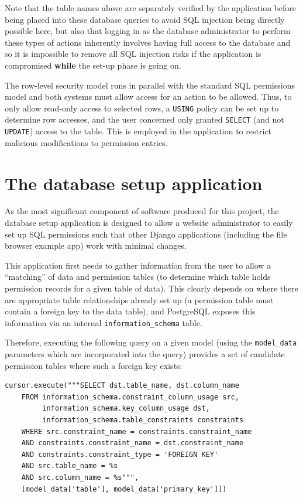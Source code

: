 \documentclass[12pt]{report}
\begin{document}
Note that the table names above are separately verified by the application before being placed into these database queries to avoid SQL injection being directly possible here, but also that logging in as the database administrator to perform these types of actions inherently involves having full access to the database and so it is impossible to remove all SQL injection risks if the application is compromised \textbf{while} the set-up phase is going on.

The row-level security model runs in parallel with the standard SQL permissions model and both systems must allow access for an action to be allowed. Thus, to only allow read-only access to selected rows, a \texttt{USING} policy can be set up to determine row accesses, and the user concerned only granted \texttt{SELECT} (and not \texttt{UPDATE}) access to the table. This is employed in the application to restrict malicious modifications to permission entries.

\section{The database setup application}
As the most significant component of software produced for this project, the database setup application is designed to allow a website administrator to easily set up SQL permissions such that other Django applications (including the file browser example app) work with minimal changes.

This application first needs to gather information from the user to allow a ``matching'' of data and permission tables (to determine which table holds permission records for a given table of data). This clearly depends on where there are appropriate table relationships already set up (a permission table must contain a foreign key to the data table), and PostgreSQL exposes this information via an internal \verb+information_schema+ table.

Therefore, executing the following query on a given model (using the \verb+model_data+ parameters which are incorporated into the query) provides a set of candidate permission tables where such a foreign key exists:

\begin{verbatim}
cursor.execute("""SELECT dst.table_name, dst.column_name
    FROM information_schema.constraint_column_usage src,
         information_schema.key_column_usage dst,
         information_schema.table_constraints constraints
    WHERE src.constraint_name = constraints.constraint_name
    AND constraints.constraint_name = dst.constraint_name
    AND constraints.constraint_type = 'FOREIGN KEY'
    AND src.table_name = %s
    AND src.column_name = %s""",
    [model_data['table'], model_data['primary_key']])
\end{verbatim}
\end{document}
